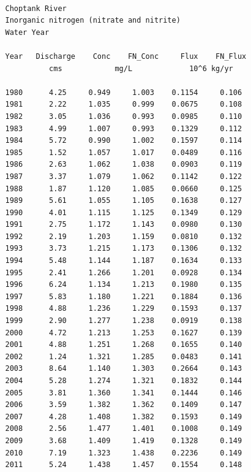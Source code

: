 \documentclass[a4paper,11pt]{article}\usepackage[]{graphicx}\usepackage[]{color}
\makeatletter
\newenvironment{kframe}{%
 \def\at@end@of@kframe{}%
 \ifinner\ifhmode%
  \def\at@end@of@kframe{\end{minipage}}%
  \begin{minipage}{\columnwidth}%
 \fi\fi%
 \def\FrameCommand##1{\hskip\@totalleftmargin \hskip-\fboxsep
 \colorbox{shadecolor}{##1}\hskip-\fboxsep
     \hskip-\linewidth \hskip-\@totalleftmargin \hskip\columnwidth}%
 \MakeFramed {\advance\hsize-\width
   \@totalleftmargin\z@ \linewidth\hsize
   \@setminipage}}%
 {\par\unskip\endMakeFramed%
 \at@end@of@kframe}
\newenvironment{knitrout}{}{} %
\makeatother
\begin{document}
\begin{knitrout}
\color{fgcolor}\begin{kframe}
\begin{verbatim}

   Choptank River 
   Inorganic nitrogen (nitrate and nitrite)
   Water Year 

   Year   Discharge    Conc    FN_Conc     Flux    FN_Flux
             cms            mg/L             10^6 kg/yr 

   1980      4.25     0.949     1.003    0.1154     0.106
   1981      2.22     1.035     0.999    0.0675     0.108
   1982      3.05     1.036     0.993    0.0985     0.110
   1983      4.99     1.007     0.993    0.1329     0.112
   1984      5.72     0.990     1.002    0.1597     0.114
   1985      1.52     1.057     1.017    0.0489     0.116
   1986      2.63     1.062     1.038    0.0903     0.119
   1987      3.37     1.079     1.062    0.1142     0.122
   1988      1.87     1.120     1.085    0.0660     0.125
   1989      5.61     1.055     1.105    0.1638     0.127
   1990      4.01     1.115     1.125    0.1349     0.129
   1991      2.75     1.172     1.143    0.0980     0.130
   1992      2.19     1.203     1.159    0.0810     0.132
   1993      3.73     1.215     1.173    0.1306     0.132
   1994      5.48     1.144     1.187    0.1634     0.133
   1995      2.41     1.266     1.201    0.0928     0.134
   1996      6.24     1.134     1.213    0.1980     0.135
   1997      5.83     1.180     1.221    0.1884     0.136
   1998      4.88     1.236     1.229    0.1593     0.137
   1999      2.90     1.277     1.238    0.0919     0.138
   2000      4.72     1.213     1.253    0.1627     0.139
   2001      4.88     1.251     1.268    0.1655     0.140
   2002      1.24     1.321     1.285    0.0483     0.141
   2003      8.64     1.140     1.303    0.2664     0.143
   2004      5.28     1.274     1.321    0.1832     0.144
   2005      3.81     1.360     1.341    0.1444     0.146
   2006      3.59     1.382     1.362    0.1409     0.147
   2007      4.28     1.408     1.382    0.1593     0.149
   2008      2.56     1.477     1.401    0.1008     0.149
   2009      3.68     1.409     1.419    0.1328     0.149
   2010      7.19     1.323     1.438    0.2236     0.149
   2011      5.24     1.438     1.457    0.1554     0.148
\end{verbatim}
\end{kframe}
\end{knitrout}
\end{document}
